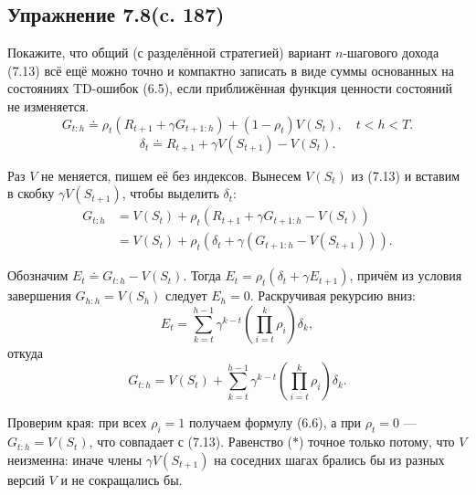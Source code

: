 \subsection{Упражнение 7.8(c. 187)}
Покажите, что общий (с разделённой стратегией) вариант $n$-шагового дохода
(7.13) всё ещё можно точно и компактно записать в виде суммы основанных
на состояниях TD-ошибок (6.5), если приближённая функция ценности состояний
не изменяется.
\begin{equation}
    G_{t:h} \doteq \rho_t\left(R_{t+1} + \gamma G_{t+1:h}\right) + (1-\rho_t)V(S_t),
    \quad t < h < T.
    \tag{7.13}
\end{equation}
\begin{equation}
    \delta_t \doteq R_{t+1} + \gamma V(S_{t+1}) - V(S_t).
    \tag{6.5}
\end{equation}
\begin{solution}
    Раз $V$ не меняется, пишем её без индексов. Вынесем $V(S_t)$ из (7.13) и
    вставим в скобку $\gamma V(S_{t+1})$, чтобы выделить $\delta_t$:
    \begin{align*}
        G_{t:h} &= V(S_t) + \rho_t\left(R_{t+1} + \gamma G_{t+1:h} - V(S_t)\right)\\
                &= V(S_t) + \rho_t\left(\delta_t + \gamma\left(G_{t+1:h} - V(S_{t+1})\right)\right).
    \end{align*}

    Обозначим $E_t \doteq G_{t:h} - V(S_t)$. Тогда $E_t = \rho_t(\delta_t + \gamma E_{t+1})$,
    причём из условия завершения $G_{h:h} = V(S_h)$ следует $E_h = 0$. Раскручивая
    рекурсию вниз:
    \begin{equation*}
        E_t = \sum_{k=t}^{h-1} \gamma^{k-t}\left(\prod_{i=t}^{k}\rho_i\right)\delta_k,
    \end{equation*}
    откуда
    \begin{equation}
        G_{t:h} = V(S_t) + \sum_{k=t}^{h-1}
        \gamma^{k-t}\left(\prod_{i=t}^{k}\rho_i\right)\delta_k.
        \tag{$\ast$}
    \end{equation}

    Проверим края: при всех $\rho_i = 1$ получаем формулу (6.6), а при $\rho_t = 0$
    --- $G_{t:h} = V(S_t)$, что совпадает с (7.13). Равенство ($\ast$) точное только
    потому, что $V$ неизменна: иначе члены $\gamma V(S_{t+1})$ на соседних шагах
    брались бы из разных версий $V$ и не сокращались бы.
\end{solution}

